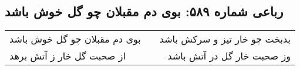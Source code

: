 \begin{center}
\section*{رباعی شماره ۵۸۹: بوی دم مقبلان چو گل خوش باشد}
\label{sec:0589}
\begin{longtable}{l p{0.5cm} r}
بوی دم مقبلان چو گل خوش باشد
&&
بدبخت چو خار تیز و سرکش باشد
\\
از صحبت گل خار ز آتش برهد
&&
وز صحبت خار گل در آتش باشد
\\
\end{longtable}
\end{center}
